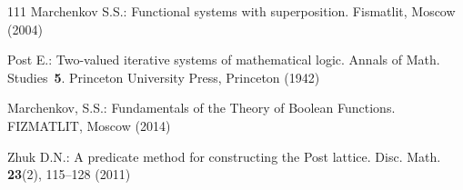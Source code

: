 \documentclass[graybox]{SNmult}
\theoremstyle{definition}
\begin{document}
\begin{thebibliography}{111}
	Marchenkov S.S.: Functional systems with superposition. Fismatlit, Moscow (2004)
	
	

	
		 Post E.: Two-valued iterative systems of mathematical logic. Annals of Math. Studies~\textbf{5}. Princeton University Press, Princeton (1942)

	
	 Marchenkov, S.S.: Fundamentals of the Theory of Boolean Functions. FIZMATLIT, Moscow (2014)
	
	Zhuk D.N.: A predicate method for constructing the Post lattice. Disc. Math. \textbf{23}(2), 115--128 (2011)
\end{thebibliography}
\end{document}
